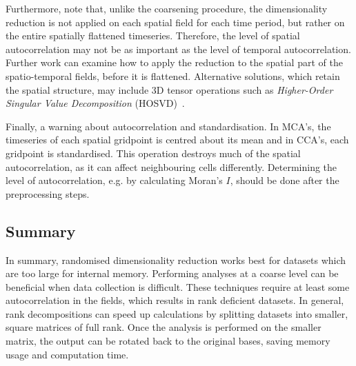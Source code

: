 \documentclass[ijgi,article,submit,moreauthors,pdftex,10pt,a4paper]{Definitions/mdpi}
\begin{document}
Furthermore, note that, unlike the coarsening procedure, the dimensionality reduction is not applied on each spatial field for each time period, but rather on the entire spatially flattened timeseries. Therefore, the level of spatial autocorrelation may not be as important as the level of temporal autocorrelation. Further work can examine how to apply the reduction to the spatial part of the spatio-temporal fields, before it is flattened. Alternative solutions, which retain the spatial structure, may include 3D tensor operations such as \textit{Higher-Order Singular Value Decomposition} (HOSVD)~\cite{Tucker1964}.

Finally, a warning about autocorrelation and standardisation. In MCA's, the timeseries of each spatial gridpoint is centred about its mean and in CCA's, each gridpoint is standardised. This operation destroys much of the spatial autocorrelation, as it can affect neighbouring cells differently. Determining the level of autocorrelation, e.g. by calculating Moran's $I$, should be done after the preprocessing steps. 

\subsection{Summary}
\label{sec:Discussion/Summary}

In summary, randomised dimensionality reduction works best for datasets which are too large for internal memory. Performing analyses at a coarse level can be beneficial when data collection is difficult. These techniques require at least some autocorrelation in the fields, which results in rank deficient datasets. %
In general, rank decompositions can speed up calculations by splitting datasets into smaller, square matrices of full rank. Once the analysis is performed on the smaller matrix, the output can be rotated back to the original bases, saving memory usage and computation time.


\end{document}
